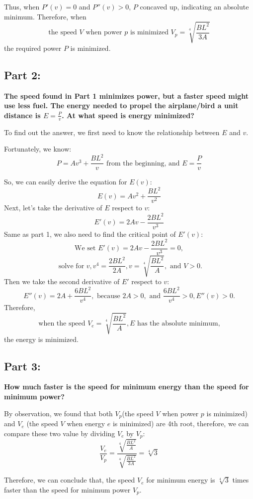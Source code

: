 \documentclass{article}
\begin{document}
Thus, when \( P'(v) = 0 \) and \( P''(v) > 0 \), \( P \) concaved up, indicating an absolute minimum. Therefore, when
\[
\text{the speed } V \text{ when power } p \text{ is minimized }  V_p = \sqrt[4]{\frac{BL^2}{3A}}
\]
the required power \( P \) is minimized.

\subsection*{Part 2:}
{\large \bfseries The speed found in Part 1 minimizes power, but a faster speed might use less fuel. The energy needed to propel the airplane/bird a unit distance is \( E = \frac{P}{v} \). At what speed is energy minimized?}

To find out the answer, we first need to know the relationship between \( E \) and \( v \). 

Fortunately, we know:
\[
P = Av^3 + \frac{BL^2}{v} \text{ from the beginning, and }
E = \frac{P}{v}
\]

So, we can easily derive the equation for \( E(v) \):
\[
E(v) = Av^2 + \frac{BL^2}{v^2}
\]
Next, let's take the derivative of \(E\) respect to \(v\):
\[
E'(v) = 2Av-\frac{2BL^2}{v^3}
\]
Same as part 1, we also need to find the critical point of \(E'(v)\):
\[\text{We set } E'(v) = 2Av-\frac{2BL^2}{v^3} = 0,\]
\[\text{ solve for }v, v^4=\frac{2BL^2}{2A}, v = \sqrt[4]{\frac{BL^2}{A}},\text{ and }V > 0.\]
Then we take the second derivative of \(E'\) respect to \(v\):
\[E''(v) = 2A + \frac{6BL^2}{v^4},
\text{ because } 2A > 0, \text{ and } \frac{6BL^2}{v^4} > 0, E''(v) > 0.\]
Therefore,
 \[\text{when the speed }V_e = \sqrt[4]{\frac{BL^2}{A}}, E\text{ has the absolute minimum,}\]
  the energy is minimized.

\subsection*{Part 3:}
{\large \bfseries How much faster is the speed for minimum energy than the speed for minimum power?
}\setlength{\parskip}{1em}

By observation, we found that both \(V_p\)(the speed \(V\) when power \(p\) is minimized) and \(V_e\) (the speed \(V\) when energy \(e\) is minimized) are 4th root, therefore, we can compare these two value by dividing \(V_e\) by \(V_p\):
\[\frac{V_e}{V_p}=\frac{\sqrt[4]{\frac{BL^2}{A}}}{\sqrt[4]{\frac{BL^2}{3A}}} = \sqrt[4]{3}\]

Therefore, we can conclude that, the speed \(V_e\) for minimum energy is \(\sqrt[4]{3}\) times faster than the speed for minimum power \(V_p\).
\end{document}

